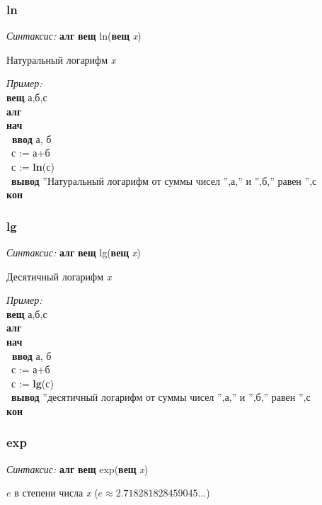 \documentclass[12pt,a4paper]{article}
\newcommand{\otstup}{\textperiodcentered\ }
\begin{document}
\normalfont
\subsubsection{ln}

\emph{Синтаксис:} \textbf{алг} \textbf{вещ} ln(\textbf{вещ} \emph{x})


     
 
		Натуральный логарифм \emph{x}
      
\emph{Пример:}  
\sffamily
~\\\textbf{вещ} а,б,с
~\\\textbf{алг
~\\нач
~\\\otstup ввод} а, б
~\\\otstup с := а+б
~\\\otstup с := \textbf{ln}(с)
~\\\otstup \textbf{вывод} ''Натуральный логарифм от суммы чисел '',а,'' и '',б,'' равен '',с
~\\\textbf{кон} 

\normalfont
\subsubsection{lg}

\emph{Синтаксис:} \textbf{алг} \textbf{вещ} lg(\textbf{вещ} \emph{x})


     
 
		Десятичный логарифм \emph{x}
      
\emph{Пример:}  
\sffamily
~\\\textbf{вещ} а,б,с
~\\\textbf{алг
~\\нач
~\\\otstup ввод} а, б
~\\\otstup с := а+б
~\\\otstup с := \textbf{lg}(с)
~\\\otstup \textbf{вывод} ''десятичный логарифм от суммы чисел '',а,'' и '',б,'' равен '',с
~\\\textbf{кон} 

\normalfont
\subsubsection{exp}

\emph{Синтаксис:} \textbf{алг} \textbf{вещ} exp(\textbf{вещ} \emph{x})


$e$ в степени числа \emph{x} ($e\approx 2.718281828459045\dots$)
      
\end{document}
